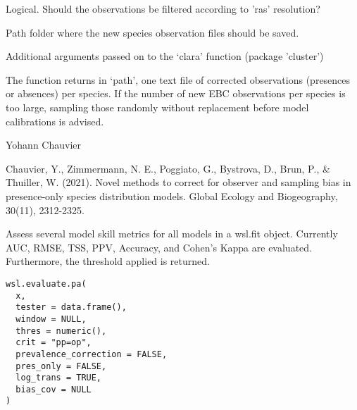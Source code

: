 \documentclass[a4paper]{book}
\begin{document}
\begin{Arguments}
\begin{ldescription}
\item[\code{filter}] Logical. Should the observations be filtered according to 'ras' resolution?

\item[\code{path}] Path folder where the new species observation files should be saved.

\item[\code{...}] Additional arguments passed on to the ‘clara’ function (package 'cluster')
\end{ldescription}
\end{Arguments}
%
\begin{Value}
The function returns in ‘path’, one text file of corrected observations (presences
or absences) per species. If the number of new EBC observations per species is too large,
sampling those randomly without replacement before model calibrations is advised.
\end{Value}
%
\begin{Author}\relax
Yohann Chauvier
\end{Author}
%
\begin{References}\relax
Chauvier, Y., Zimmermann, N. E., Poggiato, G., Bystrova, D., Brun, P., \& Thuiller, W. (2021).
Novel methods to correct for observer and sampling bias in presence‐only species distribution
models. Global Ecology and Biogeography, 30(11), 2312-2325.
\end{References}
%
\begin{Description}\relax
Assess several model skill metrics for all models in a wsl.fit object. Currently
AUC, RMSE, TSS, PPV, Accuracy, and Cohen's Kappa are evaluated. Furthermore, the
threshold applied is returned.
\end{Description}
%
\begin{Usage}
\begin{verbatim}
wsl.evaluate.pa(
  x,
  tester = data.frame(),
  window = NULL,
  thres = numeric(),
  crit = "pp=op",
  prevalence_correction = FALSE,
  pres_only = FALSE,
  log_trans = TRUE,
  bias_cov = NULL
)
\end{verbatim}
\end{Usage}
%
\end{document}

